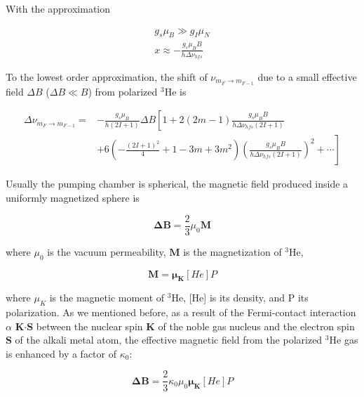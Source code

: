 With the approximation

\begin{subequations}
	\begin{gather}
	g_{s}\mu_{B} \gg g_{I}\mu_{N}\\
	x \approx -\frac{g_{s}\mu_{B}B}{h\Delta \nu_{hfs}}
	\end{gather}
\end{subequations}

To the lowest order approximation, the shift of $\nu_{m_{F}\rightarrow m_{F-1}}$ due to a small effective field $\Delta B$ ($\Delta B \ll B$) from polarized $^{3}$He is

\begin{equation}
\begin{split}
\Delta \nu_{m_{F}\rightarrow m_{F-1}} = &-\frac{g_{s}\mu_{B}}{h(2I+1)} \Delta B \left[1+ 2(2m-1)\frac{g_{s}\mu_{B}B}{h \Delta\nu_{hfs}(2I+1)}\right.\\ 
&\left.+6\left(-\frac{(2I+1)^{2}}{4}+1-3m+3m^{2}\right)\left(\frac{g_{s}\mu_{B}B}{h \Delta\nu_{hfs}(2I+1)}\right)^{2}+\cdots\right]
\end{split}
\end{equation}

Usually the pumping chamber is spherical, the magnetic field produced inside a uniformly magnetized sphere is

\begin{equation}
\boldsymbol{\Delta B}=\frac{2}{3}\mu_{0}\boldsymbol{M}
\end{equation}

where $\mu_{0}$ is the vacuum permeability, $\boldsymbol{M}$ is the magnetization of $^{3}$He, 

\begin{equation}
\boldsymbol{M}=\boldsymbol{\mu_{K}}[He]P
\end{equation}

where $\mu_{K}$ is the magnetic moment of $^{3}$He, [He] is its density, and P its polarization. As we mentioned before, as a result of the Fermi-contact interaction $\alpha$ {\bf K$\cdot$S} between the nuclear spin {\bf K} of the noble gas nucleus and the electron spin {\bf S} of the alkali metal atom, the effective magnetic field from the polarized $^{3}$He gas is enhanced by a factor of $\kappa_{0}$:

\begin{equation}
\boldsymbol{\Delta B}=\frac{2}{3} \kappa_{0}\mu_{0}\boldsymbol{\mu_{K}}[He]P
\end{equation}

